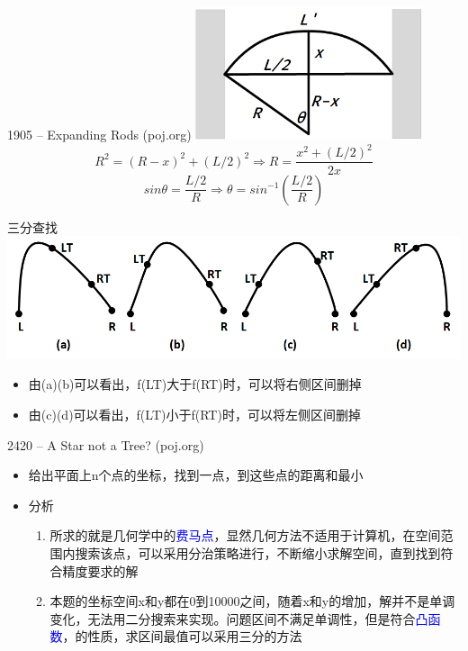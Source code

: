 \begin{frame}{1905 -- Expanding Rods (poj.org)}
    \includegraphics[width=0.5\textwidth,center]{fig/2-6.png}
    $$R^2=(R-x)^2+(L/2)^2\Rightarrow R=\frac{x^2+(L/2)^2}{2x}$$
	$$sin⁡θ=\frac{L/2}{R}\Rightarrow θ=sin^{-1}(\frac{L/2}{R})$$
\end{frame}
\begin{frame}{三分查找}
    \includegraphics[width=\textwidth]{fig/2-7.png}
    \begin{itemize}
        \item 由(a)(b)可以看出，f(LT)大于f(RT)时，可以将右侧区间删掉
        \item 由(c)(d)可以看出，f(LT)小于f(RT)时，可以将左侧区间删掉
    \end{itemize}
\end{frame}
\begin{frame}{2420 -- A Star not a Tree? (poj.org)}
    \begin{itemize}
        \item 给出平面上n个点的坐标，找到一点，到这些点的距离和最小
    \end{itemize}
    \vfill
    \begin{itemize}
        \item 分析
        \begin{enumerate}
            \item 所求的就是几何学中的\textcolor{blue}{费马点}，显然几何方法不适用于计算机，在空间范围内搜索该点，可以采用分治策略进行，不断缩小求解空间，直到找到符合精度要求的解
            \item 本题的坐标空间x和y都在0到10000之间，随着x和y的增加，解并不是单调变化，无法用二分搜索来实现。问题区间不满足单调性，但是符合\textcolor{blue}{凸函数}，的性质，求区间最值可以采用三分的方法
        \end{enumerate}
    \end{itemize}
\end{frame}
